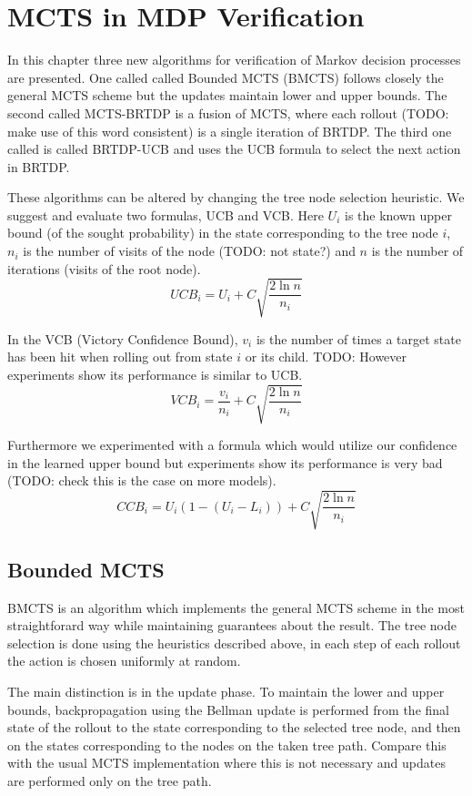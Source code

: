 \chapter{MCTS in MDP Verification}

In this chapter three new algorithms for verification of Markov
decision processes are presented. One called
called Bounded MCTS (BMCTS) follows closely the general MCTS scheme
but the updates maintain lower and upper bounds. The second called
MCTS-BRTDP is a fusion of MCTS, where each rollout (TODO: make use of
this word consistent) is a single iteration of BRTDP.
The third one called is called BRTDP-UCB and uses the UCB formula to
select the next action in BRTDP.

These algorithms can be altered by changing the tree node selection
heuristic. We suggest and evaluate two formulas, UCB and VCB. Here $U_i$
is the known upper bound (of the sought probability) in the state
corresponding to the tree node $i$, $n_i$ is the number of visits of the
node (TODO: not state?) and $n$ is the number of iterations (visits of
the root node).
\begin{equation*}
    UCB_i = U_i + C \sqrt{ \frac{2 \ln n}{n_i} }
\end{equation*}

In the VCB (Victory Confidence Bound), $v_i$ is the number of times a
target state has been hit when rolling out from state $i$ or its child.
TODO: However experiments show its performance is similar to UCB.
\[
    VCB_i = \frac{v_i}{n_i} + C \sqrt{ \frac{2 \ln n}{n_i} }
\]

Furthermore we experimented with a formula which would utilize our
confidence in the learned upper bound but experiments show its
performance is very bad (TODO: check this is the case on more models).
\[
    CCB_i = U_i (1 - (U_i - L_i)) + C \sqrt{ \frac{2 \ln n}{n_i} }
\]


\section{Bounded MCTS}

BMCTS is an algorithm which implements the general MCTS scheme in the
most straightforard way while maintaining guarantees about the result.
The tree node selection is done using the
heuristics described above, in each step of each rollout the action is
chosen uniformly at random.

The main distinction is in the update phase. To maintain the lower and
upper bounds, backpropagation using the Bellman update is performed
from the final state of the rollout to the state corresponding to
the selected tree node, and then on the states corresponding to the
nodes on the taken tree path. Compare this with the usual MCTS
implementation where this is not necessary and updates are performed
only on the tree path.

